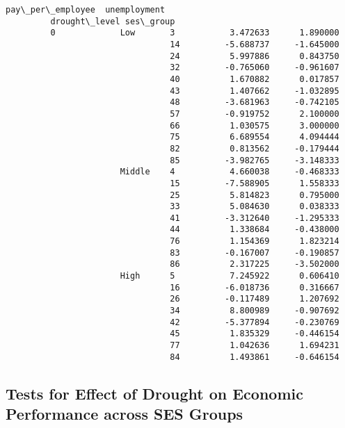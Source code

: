 \documentclass[11pt]{article}
\begin{document}
\begin{Verbatim}[commandchars=\\\{\}]
                                     pay\_per\_employee  unemployment  
         drought\_level ses\_group                                     
         0             Low       3           3.472633      1.890000  
                                 14         -5.688737     -1.645000  
                                 24          5.997886      0.843750  
                                 32         -0.765060     -0.961607  
                                 40          1.670882      0.017857  
                                 43          1.407662     -1.032895  
                                 48         -3.681963     -0.742105  
                                 57         -0.919752      2.100000  
                                 66          1.030575      3.000000  
                                 75          6.689554      4.094444  
                                 82          0.813562     -0.179444  
                                 85         -3.982765     -3.148333  
                       Middle    4           4.660038     -0.468333  
                                 15         -7.588905      1.558333  
                                 25          5.814823      0.795000  
                                 33          5.084630      0.038333  
                                 41         -3.312640     -1.295333  
                                 44          1.338684     -0.438000  
                                 76          1.154369      1.823214  
                                 83         -0.167007     -0.190857  
                                 86          2.317225     -3.502000  
                       High      5           7.245922      0.606410  
                                 16         -6.018736      0.316667  
                                 26         -0.117489      1.207692  
                                 34          8.800989     -0.907692  
                                 42         -5.377894     -0.230769  
                                 45          1.835329     -0.446154  
                                 77          1.042636      1.694231  
                                 84          1.493861     -0.646154  
\end{Verbatim}
            
    \hypertarget{tests-for-effect-of-drought-on-economic-performance-across-ses-groups}{%
\subsection{Tests for Effect of Drought on Economic Performance across
SES
Groups}\label{tests-for-effect-of-drought-on-economic-performance-across-ses-groups}}
\end{document}
